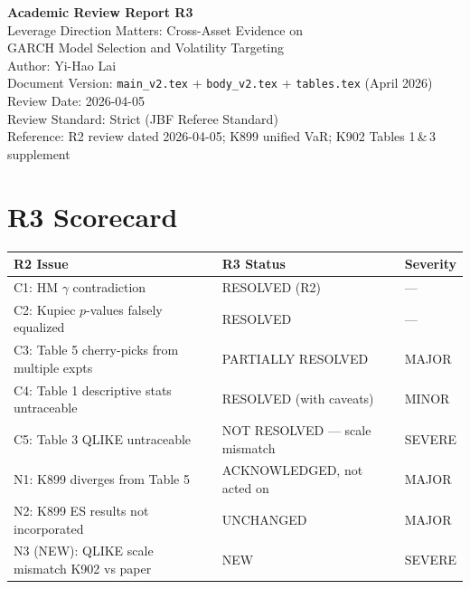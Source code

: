 \documentclass[12pt,a4paper]{article}
\begin{document}
\begin{center}
{\Large\bfseries Academic Review Report R3}\\[0.5em]
{\large Leverage Direction Matters: Cross-Asset Evidence on\\GARCH Model Selection and Volatility Targeting}\\[0.5em]
{\normalsize Author: Yi-Hao Lai}\\[0.3em]
{\normalsize Document Version: \texttt{main\_v2.tex} + \texttt{body\_v2.tex} + \texttt{tables.tex} (April 2026)}\\
{\normalsize Review Date: 2026-04-05}\\
{\normalsize Review Standard: Strict (JBF Referee Standard)}\\
{\normalsize Reference: R2 review dated 2026-04-05; K899 unified VaR; K902 Tables 1\,\&\,3 supplement}
\end{center}

\bigskip

\section*{R3 Scorecard}

\begin{tabular}{lll}
\toprule
\textbf{R2 Issue} & \textbf{R3 Status} & \textbf{Severity} \\
\midrule
C1: HM $\gamma$ contradiction & \textcolor{okgreen}{RESOLVED (R2)} & --- \\
C2: Kupiec $p$-values falsely equalized & \textcolor{okgreen}{RESOLVED} & --- \\
C3: Table 5 cherry-picks from multiple expts & \textcolor{warncolor}{PARTIALLY RESOLVED} & MAJOR \\
C4: Table 1 descriptive stats untraceable & \textcolor{resolved}{RESOLVED (with caveats)} & MINOR \\
C5: Table 3 QLIKE untraceable & \textcolor{errorred}{NOT RESOLVED --- scale mismatch} & SEVERE \\
\addlinespace
N1: K899 diverges from Table 5 & \textcolor{warncolor}{ACKNOWLEDGED, not acted on} & MAJOR \\
N2: K899 ES results not incorporated & \textcolor{warncolor}{UNCHANGED} & MAJOR \\
\addlinespace
N3 (NEW): QLIKE scale mismatch K902 vs paper & \textcolor{errorred}{NEW} & SEVERE \\
\bottomrule
\end{tabular}
\end{document}
